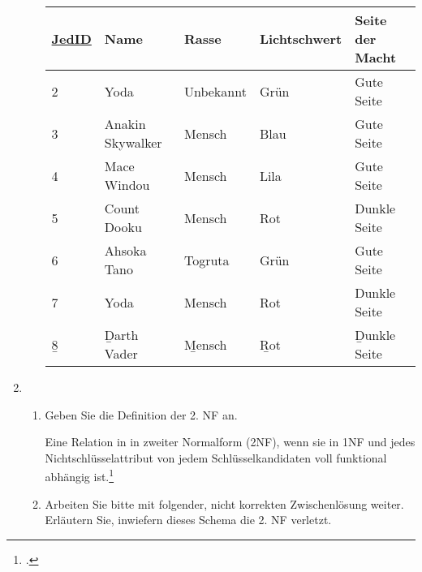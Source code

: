 \documentclass{bschlangaul-aufgabe}
\begin{document}
\begin{enumerate}
\begin{enumerate}
\begin{bAntwort}
\begin{center}
\begin{tabular}{|l|l|l|l|l|}
\hline
\underline{JedID} & Name             & Rasse        & Lichtschwert & Seite der Macht\\\hline\hline
2     & Yoda             & Unbekannt & Grün         & Gute Seite\\\hline
3     & Anakin Skywalker & Mensch    & Blau         & Gute Seite\\\hline
4     & Mace Windou      & Mensch    & Lila         & Gute Seite\\\hline
5     & Count Dooku      & Mensch    & Rot          & Dunkle Seite\\\hline
6     & Ahsoka Tano      & Togruta   & Grün         & Gute Seite\\\hline
7     & Yoda             & Mensch    & Rot          & Dunkle Seite\\\hline
\b{8}     & \b{Darth Vader}      & \b{Mensch}    & \b{Rot}          & \b{Dunkle Seite}\\\hline
\end{tabular}
\end{center}
\end{bAntwort}

\end{enumerate}


\item \strut

\begin{enumerate}


\item Geben Sie die Definition der 2. NF an.

\begin{bAntwort}
Eine Relation in in zweiter Normalform (2NF), wenn sie in 1NF und jedes
Nichtschlüsselattribut von jedem Schlüsselkandidaten voll funktional
abhängig ist.\footcite[Seite 449]{schneider}
\end{bAntwort}


\item Arbeiten Sie bitte mit folgender, nicht korrekten Zwischenlösung weiter.
Erläutern Sie, inwiefern dieses Schema die 2. NF verletzt.


\end{enumerate}
\end{enumerate}
\end{document}
